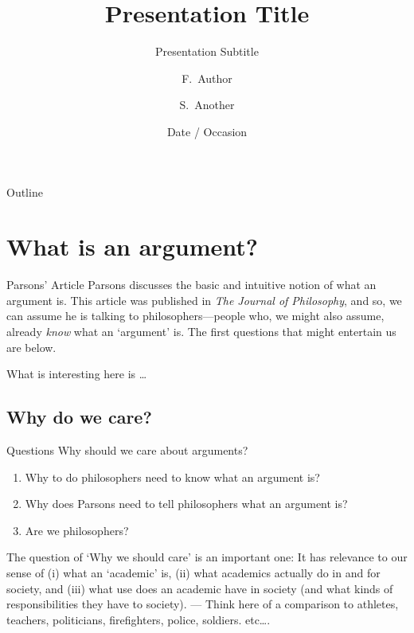 \documentclass{beamer}
\title[Short Paper Title] %
{Presentation Title}
\subtitle
{Presentation Subtitle} %
\author[Author, Another] %
{F.~Author\inst{1} \and S.~Another\inst{2}}
\institute[Universities of Somewhere and Elsewhere] %
{
  \inst{1}%
  Department of Computer Science\\
  University of Somewhere
  \and
  \inst{2}%
  Department of Theoretical Philosophy\\
  University of Elsewhere}
\date[Short Occasion] %
{Date / Occasion}
\begin{document}
\begin{frame}
  \titlepage
\end{frame}

\begin{frame}{Outline}
  \tableofcontents
\end{frame}

\section{What is an argument?}

\begin{frame}{Parsons' Article}
Parsons discusses the basic and intuitive notion of what an argument is. This article was published in \textsl{The Journal of Philosophy}, and so, we can assume he is talking to philosophers---people who, we might also assume, already \textsl{know} what an `argument' is. The first questions that might entertain us are below. 
\end{frame} 


What is interesting here is \ldots

\subsection{Why do we care?}
\begin{frame}{Questions}\label{whycare}
Why should we care about arguments?
\begin{enumerate}
\item Why to do philosophers need to know what an argument is?
\item Why does Parsons need to tell philosophers what an argument is? 
\item Are we philosophers?
\end{enumerate}
\end{frame}


The question of `Why we should care' is an important one: It has relevance to our sense of (i) what an `academic' is, (ii) what academics actually do in and for society, and (iii) what use does an academic have in society (and what kinds of responsibilities they have to society). --- Think here of a comparison to athletes, teachers, politicians, firefighters, police, soldiers. etc\ldots.
\end{document}
